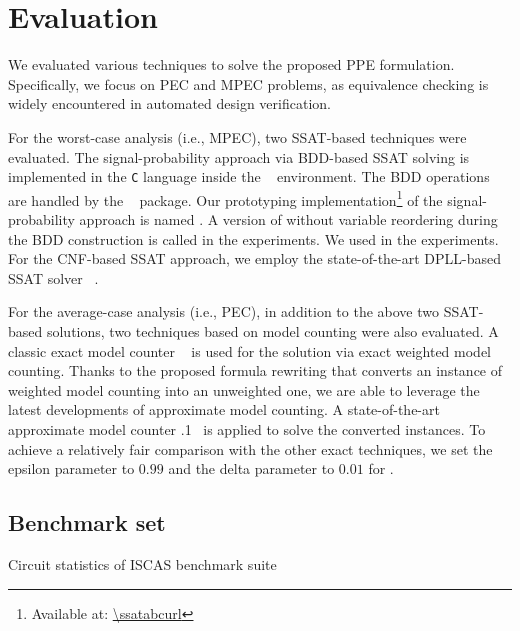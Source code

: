 \section{Evaluation}
\label{sect:prob-evaluation}

We evaluated various techniques to solve the proposed PPE formulation.
Specifically, we focus on PEC and MPEC problems,
as equivalence checking is widely encountered in automated design verification.

For the worst-case analysis (i.e., MPEC), two SSAT-based techniques were evaluated.
The signal-probability approach via BDD-based SSAT solving
is implemented in the \texttt{C} language inside the \abc~\cite{ABC} environment.
The BDD operations are handled by the \cudd~\cite{CUDD} package.
Our prototyping implementation\footnote{Available at: \url{\ssatabcurl}}
of the signal-probability approach is named \bddsp.
A version of \bddsp without variable reordering during the BDD construction
is called \bddspnr in the experiments.
We used \ssatABCRevision in the experiments.
For the CNF-based SSAT approach,
we employ the state-of-the-art DPLL-based SSAT solver \dcssat~\cite{Majercik2005}.

For the average-case analysis (i.e., PEC),
in addition to the above two SSAT-based solutions,
two techniques based on model counting were also evaluated.
A classic exact model counter \cachet~\cite{Sang2004,Sang2005ModelCounting} is used
for the solution via exact weighted model counting.
Thanks to the proposed formula rewriting
that converts an instance of weighted model counting into an unweighted one,
we are able to leverage the latest developments of approximate model counting.
A state-of-the-art approximate model counter .1~\cite{Chakraborty2013,Chakraborty2016}
is applied to solve the converted instances.
To achieve a relatively fair comparison with the other exact techniques,
we set the epsilon parameter to $0.99$ and the delta parameter to $0.01$ for \approxmc.

\subsection{Benchmark set}
\begin{table}[ht]
    \centering
    \scriptsize
    \caption{Circuit statistics of ISCAS benchmark suite}
    \label{tbl:prob-design-eval-iscas}
\end{table}

